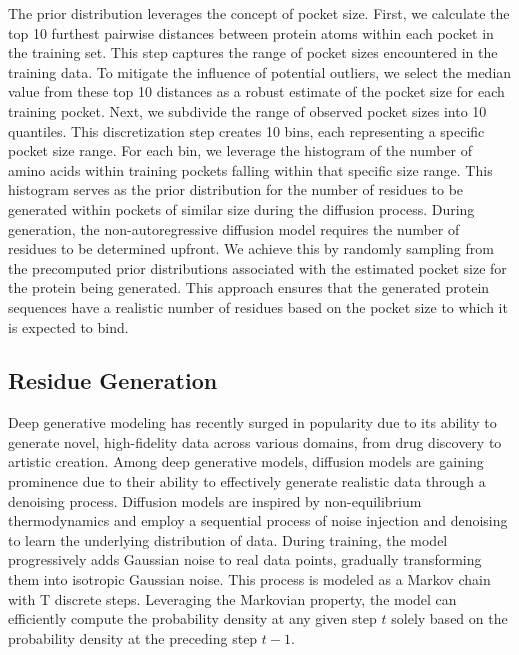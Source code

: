 The prior distribution leverages the concept of pocket size. First, we calculate the top 10 furthest pairwise distances between protein atoms within each pocket in the training set. This step captures the range of pocket sizes encountered in the training data. To mitigate the influence of potential outliers, we select the median value from these top 10 distances as a robust estimate of the pocket size for each training pocket. Next, we subdivide the range of observed pocket sizes into 10 quantiles. This discretization step creates 10 bins, each representing a specific pocket size range. For each bin, we leverage the histogram of the number of amino acids within training pockets falling within that specific size range. This histogram serves as the prior distribution for the number of residues to be generated within pockets of similar size during the diffusion process. During generation, the non-autoregressive diffusion model requires the number of residues to be determined upfront.  We achieve this by randomly sampling from the precomputed prior distributions associated with the estimated pocket size for the protein being generated. This approach ensures that the generated protein sequences have a realistic number of residues based on the pocket size to which it is expected to bind.

\subsection{Residue Generation}
Deep generative modeling has recently surged in popularity due to its ability to generate novel, high-fidelity data across various domains, from drug discovery to artistic creation. Among deep generative models, diffusion models are gaining prominence due to their ability to effectively generate realistic data through a denoising process. Diffusion models are inspired by non-equilibrium thermodynamics \cite{sohl2015deep, ho2020denoising} and employ a sequential process of noise injection and denoising to learn the underlying distribution of data. During training, the model progressively adds Gaussian noise to real data points, gradually transforming them into isotropic Gaussian noise. This process is modeled as a Markov chain with T discrete steps. Leveraging the Markovian property, the model can efficiently compute the probability density at any given step $t$ solely based on the probability density at the preceding step $t-1$. \\

